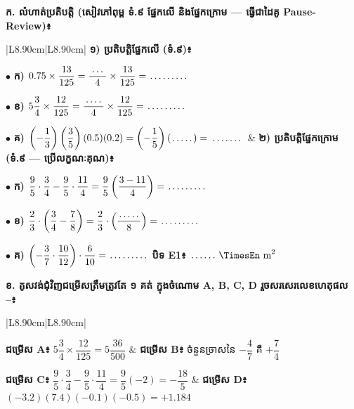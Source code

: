 \documentclass[a4paper,10pt]{article}
\newcommand{\en}[1]{{\TimesEn #1}}
\newcommand{\unit}[1]{\,\text{\en{#1}}}
\newcommand{\cnum}[1]{\mbox{\fontsize{10pt}{12pt}\selectfont\ding{\numexpr181+#1\relax}}}
\newcommand{\blank}[1][1.5cm]{\makebox[#1]{\dotfill}}
\begin{document}
\textbf{ក. លំហាត់ប្រតិបត្តិ (សៀវភៅពុម្ព ទំ.៩ ផ្នែកលើ និងផ្នែកក្រោម — ធ្វើជាដៃគូ \en{Pause-Review})៖}

{\renewcommand{\arraystretch}{1.48}
\begin{tabular}{|L{8.90cm}|L{8.90cm}|}
  \hline
  \textbf{១) ប្រតិបត្តិផ្នែកលើ (ទំ.៩)៖}\par\vspace{2.5pt}
  $\bullet$ \textbf{ក)} $0.75\times\dfrac{13}{125} = \dfrac{\blank[0.6cm]}{4}\times\dfrac{13}{125} = \blank[1.4cm]$\par\vspace{2.5pt}
  $\bullet$ \textbf{ខ)} $5\dfrac{3}{4}\times\dfrac{12}{125} = \dfrac{\blank[0.7cm]}{4}\times\dfrac{12}{125} = \blank[1.4cm]$\par\vspace{2.5pt}
  $\bullet$ \textbf{គ)} $\left(-\dfrac{1}{3}\right)\left(\dfrac{3}{5}\right)(0.5)(0.2) = \left(-\dfrac{1}{5}\right)(\blank[0.8cm]) = \blank[1.2cm]$
  &
  \textbf{២) ប្រតិបត្តិផ្នែកក្រោម (ទំ.៩ — ប្រើលក្ខណៈគុណ)៖}\par\vspace{2.5pt}
  $\bullet$ \textbf{ក)} $\dfrac{9}{5}\cdot\dfrac{3}{4}-\dfrac{9}{5}\cdot\dfrac{11}{4} = \dfrac{9}{5}\left(\dfrac{3-11}{4}\right) = \blank[1.4cm]$\par\vspace{2.5pt}
  $\bullet$ \textbf{ខ)} $\dfrac{2}{3}\cdot\left(\dfrac{3}{4}-\dfrac{7}{8}\right) = \dfrac{2}{3}\cdot\left(\dfrac{\blank[0.8cm]}{8}\right) = \blank[1.4cm]$\par\vspace{2.5pt}
  $\bullet$ \textbf{គ)} $\left(-\dfrac{3}{7}\cdot\dfrac{10}{12}\right)\cdot\dfrac{6}{10} = \blank[1.4cm]$ \;\en{|}\; \textbf{បិទ \en{E1}៖} $\blank[1.0cm]\unit{m}^2$ \\
  \hline
\end{tabular}}

\vspace{5pt}
\textbf{ខ. គូសវង់ជុំវិញជម្រើសត្រឹមត្រូវតែ ១ គត់ ក្នុងចំណោម \en{A, B, C, D} រួចសរសេរលេខហេតុផល \cnum{1}--\cnum{5}៖}

{\renewcommand{\arraystretch}{1.75}
\begin{tabular}{|L{8.90cm}|L{8.90cm}|}
  \hline
  \rule[-9pt]{0pt}{24pt}\textbf{ជម្រើស \en{A}៖} $5\dfrac{3}{4}\times\dfrac{12}{125} = 5\dfrac{36}{500}$ &
  \textbf{ជម្រើស \en{B}៖} ចំនួនច្រាសនៃ $-\dfrac{4}{7}$ គឺ $+\dfrac{7}{4}$ \\
  \hline
  \rule[-9pt]{0pt}{24pt}\textbf{ជម្រើស \en{C}៖} $\dfrac{9}{5}\cdot\dfrac{3}{4}-\dfrac{9}{5}\cdot\dfrac{11}{4} = \dfrac{9}{5}(-2) = -\dfrac{18}{5}$ &
  \textbf{ជម្រើស \en{D}៖} $(-3.2)(7.4)(-0.1)(-0.5) = +1.184$ \\
  \hline
\end{tabular}}
\end{document}
